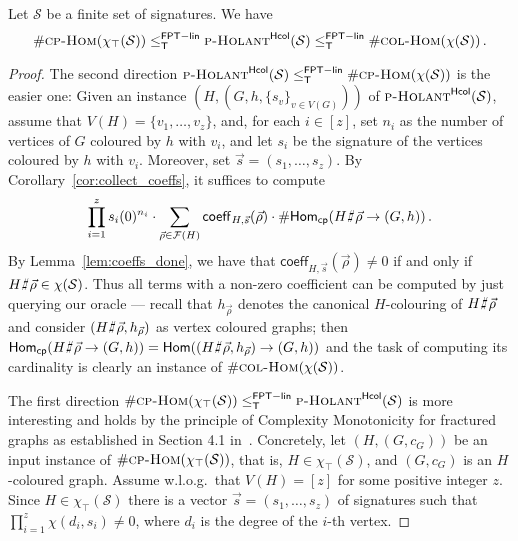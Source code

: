 \documentclass[authorcolumns,numberwithinsect]{no-lipics-v2022}
\newcommand{\homs}[2]{\mathsf{Hom}(#1 \to #2)}
\newcommand{\homsupp}{\chi}
\newcommand{\cphomsprob}{\text{\sc{cp-Hom}}}
\newcommand{\colhomsprob}{\text{\sc{col-Hom}}}
\newcommand{\fptlinred}{\leq^{\mathsf{FPT-lin}}_{\mathsf{T}}}
\def\fracture#1#2{\ensuremath{#1\raisebox{.2ex}{\rotatebox[origin=c]{-15}{$\sharp$}}#2}}
\newcommand{\holantprobstar}{\text{\sc{p-Holant}}^{\mathsf{Hcol}}}
\newcommand{\homscp}{\mathsf{Hom}_{\mathsf{cp}}}
\def\fracture#1#2{\ensuremath{#1\raisebox{.2ex}{\rotatebox[origin=c]{-15}{$\sharp$}}#2}}
\begin{document}
\begin{lemma}\label{lem:holant_sandwich}
    Let $\mathcal{S}$ be a finite set of signatures. We have
    \[\#\cphomsprob(\homsupp_\top(\mathcal{S})) \fptlinred \holantprobstar(\mathcal{S}) \fptlinred \#\colhomsprob(\homsupp(\mathcal{S})) \,.\]
\end{lemma}
\begin{proof}
    The second direction $\holantprobstar(\mathcal{S}) \fptlinred \#\cphomsprob(\homsupp(\mathcal{S}))$
    is the easier one: Given an instance $(H,(G,h,\{s_v\}_{v\in V(G)}))$ of $\holantprobstar(\mathcal{S})$,
    assume that $V(H)=\{v_1,\dots,v_z\}$, and, for each $i\in [z]$, set $n_i$ as the number of vertices of $G$ coloured by $h$ with $v_i$, and let $s_i$ be the signature of the vertices coloured by $h$ with $v_i$. Moreover, set $\vec{s}=(s_1,\dots,s_z)$. By Corollary~\ref{cor:collect_coeffs}, it suffices to compute  
    \[  \prod_{i=1}^z s_i(0)^{n_i} \cdot  \sum_{\vec{\rho}\in \mathcal{F}(H)} \mathsf{coeff}_{H,\vec{s}}(\vec{\rho})  \cdot \#\homscp(\fracture{H}{\vec{\rho}} \to (G,h)) \,.\]
    By Lemma~\ref{lem:coeffs_done}, we have that $\mathsf{coeff}_{H,\vec{s}}(\vec{\rho})\neq 0$ if and only if $\fracture{H}{\vec{\rho}}\in \homsupp(\mathcal{S})$. Thus all terms with a non-zero coefficient can be computed by just querying our oracle --- recall that $h_{\vec{\rho}}$ denotes the canonical $H$-colouring of $\fracture{H}{\vec{\rho}}$ and consider $(\fracture{H}{\vec{\rho}},h_{\vec{\rho}})$ as vertex coloured graphs; then $\homscp(\fracture{H}{\vec{\rho}} \to (G,h)) = \homs{(\fracture{H}{\vec{\rho}},h_{\vec{\rho}})}{(G,h)}$ and the task of computing its cardinality is clearly an instance of $\#\colhomsprob(\homsupp(\mathcal{S}))$.

    The first direction $\#\cphomsprob(\homsupp_\top(\mathcal{S})) \fptlinred \holantprobstar(\mathcal{S})$ is more interesting and holds by the principle of Complexity Monotonicity for fractured graphs as established in Section 4.1 in~\cite{PeyerimhoffRSSVW23}. Concretely, let $(H,(G,c_G))$ be an input instance of $\#\cphomsprob(\homsupp_\top(\mathcal{S}))$, that is, $H\in \homsupp_\top(\mathcal{S})$, and $(G,c_G)$ is an $H$-coloured graph. Assume w.l.o.g.\ that $V(H)=[z]$ for some positive integer $z$. Since $H\in \homsupp_\top(\mathcal{S})$ 
    there is a vector $\vec{s}=(s_1,\dots,s_z)$ of signatures such that
    $ \prod_{i=1}^z \chi(d_i,s_i) \neq 0$,
    where $d_i$ is the degree of the $i$-th vertex.
    

\end{proof}
\end{document}
